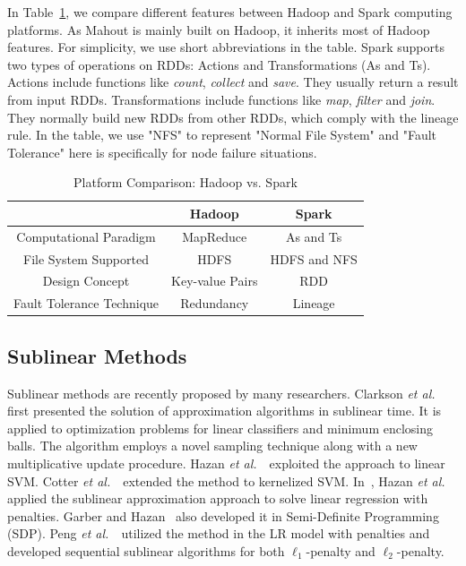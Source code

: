 \documentclass[10pt, conference, compsocconf]{IEEEtran}
\def\etal{{\em et al.\/}\,}
\begin{document}
In Table~\ref{tab:systemcmp}, we compare different features between Hadoop and Spark computing platforms.
As Mahout is mainly built on Hadoop, it inherits most of Hadoop features.
For simplicity, we use short abbreviations in the table.
Spark supports two types of operations on RDDs: Actions and Transformations (As and Ts).
Actions include functions like \textit{count}, \textit{collect} and \textit{save}. They usually return a result from input RDDs.
Transformations include functions like \textit{map}, \textit{filter} and \textit{join}. They normally build new RDDs from other RDDs, which comply with the lineage rule.
In the table, we use "NFS" to represent "Normal File System" and "Fault Tolerance" here is specifically for node failure situations.
\begin{table}[h]
\centering
\caption{Platform Comparison: Hadoop vs. Spark}\label{tab:systemcmp}\vspace{-0.3cm}
\begin{tabular}{|c|c|c|}
\hline
           & Hadoop & Spark \\
\hline
Computational Paradigm  & MapReduce & As and Ts \\
\hline
File System Supported & HDFS & HDFS and NFS \\
\hline
Design Concept  & Key-value Pairs & RDD \\
\hline
Fault Tolerance Technique & Redundancy & Lineage \\
\hline
\end{tabular}\vspace{-0.5cm}
\end{table}

\subsection{Sublinear Methods}
Sublinear methods are recently proposed by many researchers.
Clarkson \etal~\cite{clarkson2010sublinear} first presented the solution of approximation algorithms in sublinear time.
It is applied to optimization problems for linear classifiers and minimum enclosing balls.
The algorithm employs a novel sampling technique along with a new multiplicative update procedure.
Hazan \etal~\cite{hazanbeating} exploited the approach to linear SVM.
Cotter \etal~\cite{cotter2012kernelized} extended the method to kernelized SVM.
In~\cite{hazan2011optimal}, Hazan \etal applied the sublinear approximation approach to solve linear regression with penalties.
Garber and Hazan~\cite{garberapproximating} also developed it in Semi-Definite Programming (SDP).
Peng \etal~\cite{peng2012sublinear} utilized the method in the LR model with penalties and developed sequential sublinear algorithms for both $\ell_1$-penalty and $\ell_2$-penalty.
\end{document}
